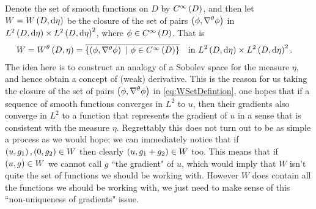 Denote the set of smooth functions on $D$ by $C^{\infty}\left( D \right)$, and then let $W=W\left( D,\mathrm{d}\eta \right)$ be the closure of the set of pairs $\left( \phi,\nabla^{\theta}\phi \right)$ in $L^{2}\left( D,\mathrm{d}\eta \right)\times L^{2}\left( D,\mathrm{d}\eta \right)^2$, where $\phi\in C^{\infty}\left( D \right)$.
That is
\begin{align} \label{eq:WSetDefinition}
	W = W^{\theta}\left( D,\eta \right) &= \overline{\left\{ \left( \phi,\nabla^{\theta}\phi \right) \ \vert \ \phi\in C^{\infty}\left( D \right) \right\}} \quad \text{in} \ L^{2}\left( D,\mathrm{d}\eta \right)\times L^{2}\left( D,\mathrm{d}\eta \right)^2.
\end{align}
The idea here is to construct an analogy of a Sobolev space for the measure $\eta$, and hence obtain a concept of (weak) derivative.
This is the reason for us taking the closure of the set of pairs $\left( \phi, \nabla^{\theta}\phi \right)$ in \eqref{eq:WSetDefintion}, one hopes that if a sequence of smooth functions converges in $L^2$ to $u$, then their gradients also converge in $L^2$ to a function that represents the gradient of $u$ in a sense that is consistent with the measure $\eta$.
Regrettably this does not turn out to be as simple a process as we would hope; we can immediately notice that if $\left( u,g_1 \right),\left( 0,g_2 \right)\in W$ then clearly $\left( u, g_1+g_2 \right)\in W$ too.
This means that if $\left( u,g \right)\in W$ we cannot call $g$ ``the gradient" of $u$, which would imply that $W$ isn't quite the set of functions we should be working with.
However $W$ does contain all the functions we should be working with, we just need to make sense of this ``non-uniqueness of gradients" issue. \newline

